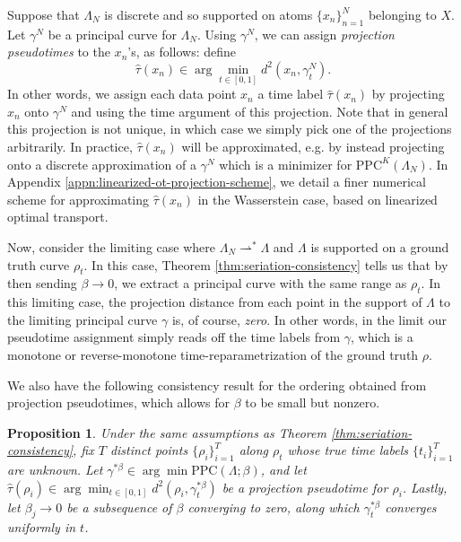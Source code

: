 \documentclass[aos, preprint]{imsart}
\theoremstyle{plain}
\newtheorem{prop}[theorem]{Proposition}
\theoremstyle{remark}
\begin{document}
{Suppose that $\Lambda_N$ is discrete and so supported on atoms $\{x_n\}_{n=1}^N$ belonging to $X$. Let $\gamma^N$ be a principal curve for $\Lambda_N$. Using $\gamma^N$, we can assign \emph{projection pseudotimes}
 to the $x_n$'s, as follows: define
\begin{equation}
\label{eq:pseudotime_objective}
\hat{\tau}(x_n)\in\arg\min_{t\in [0,1]}d^2(x_n,\gamma_t^N).
\end{equation}
In other words, we assign each data point $x_n$ a time label $\hat{\tau}(x_n)$ by projecting $x_n$ onto $\gamma^N$ and using the time argument of this projection. Note that in general this projection is not unique, in which case we simply pick one of the projections arbitrarily. In practice, $\hat{\tau}(x_n)$ will be approximated, e.g. by instead projecting onto a discrete approximation of a $\gamma^N$ which is a minimizer for  $\mathrm{PPC}^K(\Lambda_N)$. In Appendix \ref{appn:linearized-ot-projection-scheme}, we detail a finer numerical scheme for approximating $\hat{\tau}(x_n)$ in the Wasserstein case, based on linearized optimal transport.

Now, consider the limiting case where $\Lambda_N \rightharpoonup^* \Lambda$ and $\Lambda$ is supported on a ground truth curve $\rho_t$. In this case, Theorem \ref{thm:seriation-consistency} tells us that by then sending $\beta\rightarrow 0$, we extract a principal curve with the same range as $\rho_t$. In this limiting case, the projection distance from each point in the support of $\Lambda$ to the limiting principal curve $\gamma$ is, of course, \emph{zero}. In other words, in the limit our pseudotime assignment simply reads off the time labels from $\gamma$, which is a monotone or reverse-monotone time-reparametrization of the ground truth $\rho$.

We also have the following consistency result for the ordering obtained from projection pseudotimes, which allows for $\beta$ to be small but nonzero.

\begin{prop}
\label{prop:pseudotimes-consistency}
Under the same assumptions as Theorem \ref{thm:seriation-consistency}, fix $T$ distinct points $\{\rho_i\}_{i=1}^T$ along $\rho_t$ whose true time labels $\{t_i\}_{i=1}^T$ are unknown. Let $\gamma^{*\beta}\in\arg\min\textrm{PPC}(\Lambda;\beta)$, and let $\hat{\tau}(\rho_i)\in\arg\min_{t\in[0,1]}d^2(\rho_i,\gamma^{*\beta}_t)$ be a projection pseudotime for $\rho_i$. Lastly, let $\beta_j \rightarrow 0$ be a subsequence of $\beta$ converging to zero, along which $\gamma^{*\beta}_t$ converges uniformly in $t$.


\end{prop}}
\end{document}
